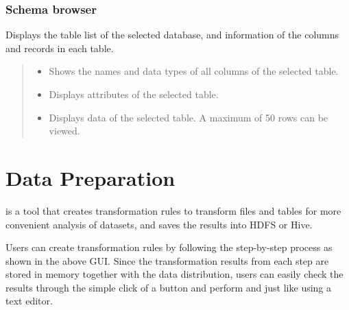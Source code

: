 \documentclass[letterpaper,10pt,english]{sphinxmanual}
\begin{document}
\subsection{Schema browser}
\label{\detokenize{discovery/part06/06_03-use_a_workbench:workbench-use-6}}\label{\detokenize{discovery/part06/06_03-use_a_workbench:id11}}
Displays the table list of the selected database, and information of the columns and records in each table.
\begin{quote}

\begin{figure}[H]
\centering

\noindent{}
\end{figure}
\begin{itemize}
\item {} 
 Shows the names and data types of all columns of the selected table.

\item {} 
 Displays attributes of the selected table.

\item {} 
 Displays data of the selected table. A maximum of 50 rows can be viewed.

\end{itemize}
\end{quote}


\chapter{Data Preparation}
\label{\detokenize{discovery/part07/index:id1}}\label{\detokenize{discovery/part07/index::doc}}
 is a tool that creates transformation rules to transform files and tables for more convenient analysis of datasets, and saves the results into HDFS or Hive.

\begin{quote}

\begin{figure}[H]
\centering

\noindent{}
\end{figure}
\end{quote}

Users can create transformation rules by following the step-by-step process as shown in the above GUI. Since the transformation results from each step are stored  in memory together with the data distribution, users can easily check the results through the simple click of a button and perform  and  just like using a text editor.
\end{document}
